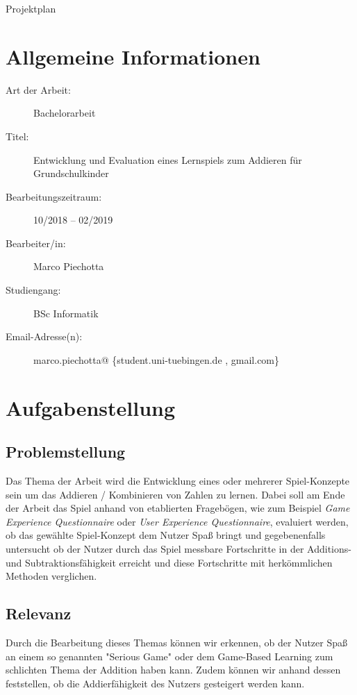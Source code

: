 \documentclass[a4paper]{article}
\begin{document}
\begin{center}
\LARGE Projektplan
\end{center}
\vspace{1cm}

\section{Allgemeine Informationen}
\begin{description}
	\item[Art der Arbeit:] Bachelorarbeit
    \item[Titel:] Entwicklung und Evaluation eines Lernspiels zum Addieren für Grundschulkinder
    \item[Bearbeitungszeitraum:] 10/2018 -- 02/2019
	\item[Bearbeiter/in:] Marco Piechotta
    \item[Studiengang:] BSc Informatik
    \item[Email-Adresse(n):] marco.piechotta@ \{student.uni-tuebingen.de , gmail.com\}
\end{description}


\section{Aufgabenstellung}

\subsection{Problemstellung}
Das Thema der Arbeit wird die Entwicklung eines oder mehrerer Spiel-Konzepte sein um das Addieren / Kombinieren von Zahlen zu lernen. Dabei soll am Ende der Arbeit das Spiel anhand von etablierten Fragebögen, wie zum Beispiel \textit{Game Experience Questionnaire} oder \textit{User Experience Questionnaire}, evaluiert werden, ob das gewählte Spiel-Konzept dem Nutzer Spaß bringt und gegebenenfalls untersucht ob der Nutzer durch das Spiel messbare Fortschritte in der Additions- und Subtraktionsfähigkeit erreicht und diese Fortschritte mit herkömmlichen Methoden verglichen.\\

\subsection{Relevanz}
Durch die Bearbeitung dieses Themas können wir erkennen, ob der Nutzer Spaß an einem so genannten "Serious Game" oder dem Game-Based Learning zum schlichten Thema der Addition haben kann. Zudem können wir anhand dessen feststellen, ob die Addierfähigkeit des Nutzers gesteigert werden kann.
\end{document}

